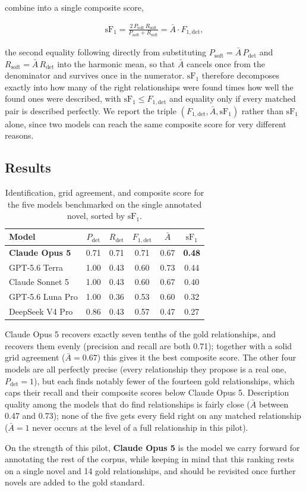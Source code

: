 combine into a single composite score,

\begin{align}
\mathrm{sF}_1 = \frac{2\,P_{\mathrm{soft}}\,R_{\mathrm{soft}}}{P_{\mathrm{soft}} + R_{\mathrm{soft}}} = \bar{A} \cdot F_{1,\mathrm{det}} ,
\end{align}

the second equality following directly from substituting $P_{\mathrm{soft}} = \bar A \, P_{\mathrm{det}}$
and $R_{\mathrm{soft}} = \bar A \, R_{\mathrm{det}}$ into the harmonic mean, so that $\bar A$
cancels once from the denominator and survives once in the numerator. $\mathrm{sF}_1$
therefore decomposes exactly into how many of the right relationships were found times how
well the found ones were described, with $\mathrm{sF}_1 \le F_{1,\mathrm{det}}$ and equality
only if every matched pair is described perfectly. We report the triple
$(F_{1,\mathrm{det}}, \bar A, \mathrm{sF}_1)$ rather than $\mathrm{sF}_1$ alone, since two
models can reach the same composite score for very different reasons.

\subsection{Results}

\begin{table}[h]
  \centering
  \small
  \begin{tabular}{lccccc}
    \toprule
    Model & $P_{\mathrm{det}}$ & $R_{\mathrm{det}}$ & $F_{1,\mathrm{det}}$ & $\bar{A}$ & $\mathrm{sF}_1$ \\
    \midrule
    \textbf{Claude Opus 5} & 0.71 & 0.71 & 0.71 & 0.67 & \textbf{0.48} \\
    GPT-5.6 Terra          & 1.00 & 0.43 & 0.60 & 0.73 & 0.44 \\
    Claude Sonnet 5        & 1.00 & 0.43 & 0.60 & 0.67 & 0.40 \\
    GPT-5.6 Luna Pro       & 1.00 & 0.36 & 0.53 & 0.60 & 0.32 \\
    DeepSeek V4 Pro        & 0.86 & 0.43 & 0.57 & 0.47 & 0.27 \\
    \bottomrule
  \end{tabular}
  \caption{Identification, grid agreement, and composite score for the five models
  benchmarked on the single annotated novel, sorted by $\mathrm{sF}_1$.}
  \label{tab:model-results}
\end{table}

Claude Opus 5 recovers exactly seven tenths of the gold relationships, and recovers them
evenly (precision and recall are both 0.71); together with a solid grid agreement
($\bar A = 0.67$) this gives it the best composite score. The other four models are all
perfectly precise (every relationship they propose is a real one, $P_{\mathrm{det}} = 1$),
but each finds notably fewer of the fourteen gold relationships, which caps their recall
and their composite scores below Claude Opus 5. Description quality among the models that
do find relationships is fairly close ($\bar A$ between 0.47 and 0.73); none of the five
gets every field right on any matched relationship ($\bar A = 1$ never occurs at the level
of a full relationship in this pilot).

On the strength of this pilot, \textbf{Claude Opus 5} is the model we carry forward for
annotating the rest of the corpus, while keeping in mind that this ranking rests on a
single novel and 14 gold relationships, and should be revisited once further novels are
added to the gold standard.

